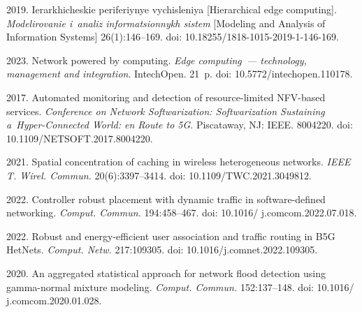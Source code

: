 
  \begin{multicols}{2}

\renewcommand{\bibname}{\protect\rmfamily References}

{\small\frenchspacing
 {%
 \begin{thebibliography}{99} 

2019. Ierar\-khi\-che\-skie pe\-ri\-fe\-riy\-nye vy\-chis\-le\-niya [Hierarchical edge computing]. 
\textit{Mo\-de\-li\-ro\-va\-nie i~ana\-liz in\-for\-ma\-tsi\-on\-nykh sis\-tem} 
[Modeling and Analysis of Information Systems] 26(1):146--169. doi: 10.18255/1818-1015-2019-1-146-169.

 2023. 
Network powered by computing. \textit{Edge computing~--- technology, management and integration}.  
IntechOpen. 21~p. doi: 10.5772/intechopen.110178.

 2017. Automated monitoring and detection of resource-limited NFV-based services. 
 \textit{Conference on Network Softwarization: Softwarization Sustaining a~Hyper-Connected World: en Route to 5G}. 
Piscataway, NJ: IEEE. 8004220. doi: 10.1109/NETSOFT.2017.8004220.

 2021. Spatial concentration of caching in wireless heterogeneous networks. \textit{IEEE T. Wirel. Commun.} 
 20(6):3397--3414. doi: 10.1109/TWC.2021.3049812.

 2022. Controller robust placement with dynamic traffic in software-defined networking. \textit{Comput. Commun.} 194:458--467. 
 doi: 10.1016/ j.comcom.2022.07.018.

 2022. Robust and energy-efficient 
user association and traffic routing in B5G HetNets. 
\textit{Comput. Netw.} 217:109305. doi: 10.1016/j.comnet.2022.109305.

 2020. An aggregated statistical approach for network flood detection using 
 gamma-normal mixture modeling. \textit{Comput. Commun.}
  152:137--148. doi: 10.1016/ j.comcom.2020.01.028.


\end{thebibliography}}}
\end{multicols}
